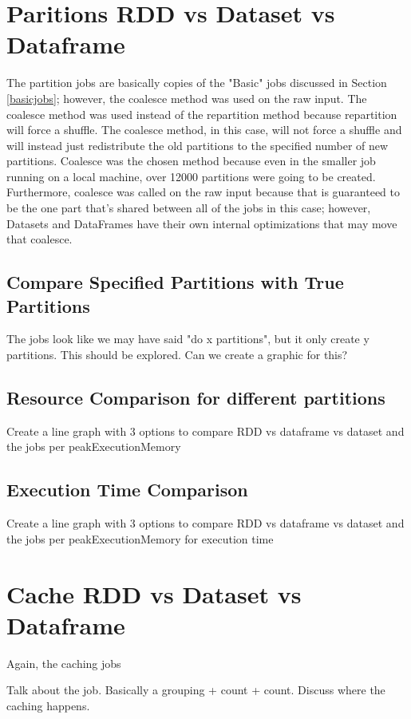 \documentclass[conference]{IEEEtran}
\begin{document}
\section{Paritions RDD vs Dataset vs Dataframe}
The partition jobs are basically copies of the "Basic" jobs discussed in Section \ref{basicjobs}; however, the coalesce method was used on the raw input.
The coalesce method was used instead of the repartition method because repartition will force a shuffle.
The coalesce method, in this case, will not force a shuffle and will instead just redistribute the old partitions to the specified number of new partitions.
Coalesce was the chosen method because even in the smaller job running on a local machine, over 12000 partitions were going to be created.
Furthermore, coalesce was called on the raw input because that is guaranteed to be the one part that's shared between all of the jobs in this case;
however, Datasets and DataFrames have their own internal optimizations that may move that coalesce.

\subsection{Compare Specified Partitions with True Partitions}
The jobs look like we may have said "do x partitions", but it only create y partitions. This should be explored.
Can we create a graphic for this?

\subsection{Resource Comparison for different partitions}
Create a line graph with 3 options to compare RDD vs dataframe vs dataset and the jobs per peakExecutionMemory

\subsection{Execution Time Comparison}
Create a line graph with 3 options to compare RDD vs dataframe vs dataset and the jobs per peakExecutionMemory for execution time


\section{Cache RDD vs Dataset vs Dataframe}
Again, the caching jobs

Talk about the job. Basically a grouping + count + count.  Discuss where the caching happens.
\end{document}

